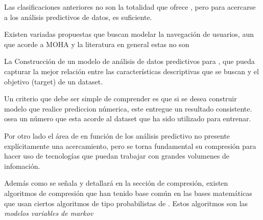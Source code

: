 Las clasificaciones anteriores no son la totalidad que ofrece \machinelearning, pero para acercarse a los análisis predictivos de datos, es suficiente.







Existen variadas propuestas que buscan modelar la navegación de usuarios, aun que acorde a MOHA y la literatura en general estas no son \online













La Construcción de un modelo de análisis de datos predictivos para \machinelearning, que pueda capturar  la mejor relación entre las características descriptivas que se buscan y el objetivo (target) de un dataset.

Un criterio que debe ser simple de comprender es que si se desea construir modelo que realice prediccion númerica, este entregue un resultado consistente. osea un número que esta acorde al dataset que ha sido utilizado para entrenar.





Por otro lado el área de \losslessdatacompression en función de los análisis predictivo no presente explícitamente una acercamiento, pero se torna fundamental su compresión para hacer uso de tecnologías que puedan trabajar con grandes volumenes de infomación.




Además como se señala y detallará en la sección de compresión, existen algoritmos de compresión que han tenido base común en las bases matemáticas que usan ciertos algoritmos de tipo probabilistas de \machinelearning. Estos algoritmos son las \emph{modelos variables de markov}










